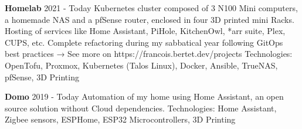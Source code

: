 

\begin{cventries}

  \cvproject
    {\textbf{Homelab}} %
    {2021 - Today} %
    {
      Kubernetes cluster composed of 3 N100 Mini computers, a homemade NAS and a pfSense router, enclosed in four 3D printed mini Racks. \newline
      Hosting of services like Home Assistant, PiHole, KitchenOwl, *arr suite, Plex, CUPS, etc. \newline
      Complete refactoring during my sabbatical year following GitOps best practices → See more on https://francois.bertet.dev/projects
    }
    {Technologies: OpenTofu, Proxmox, Kubernetes (Talos Linux), Docker, Ansible, TrueNAS, pfSense, 3D Printing}

  \cvproject
    {\textbf{Domo}} %
    {2019 - Today} %
    {
      Automation of my home using Home Assistant, an open source solution without Cloud dependencies.
    }
    {Technologies: Home Assistant, Zigbee sensors, ESPHome, ESP32 Microcontrollers, 3D Printing}

\end{cventries}
